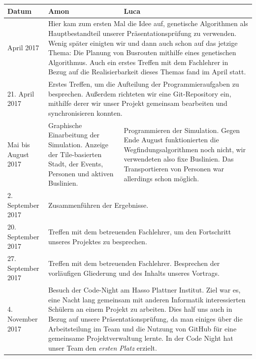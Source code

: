 \documentclass[a4paper, 11pt]{scrartcl}
\begin{document}
\newlength\tabledate
\newlength\tablecontent
\newlength\tablerow
\setlength{\tabledate}{3.5cm}
\setlength{\tablecontent}{10.5cm}
\setlength{\tablerow}{5.1cm}
\begin{longtable}{p{\tabledate}|p{\tablerow}|p{\tablerow}} %

\textbf{Datum} & \textbf{Amon} & \textbf{Luca} \\
\hline

April 2017 & \multicolumn{2}{p{\tablecontent}}{Hier kam zum ersten Mal die Idee auf, genetische Algorithmen als Hauptbestandteil unserer Präsentationsprüfung zu verwenden. Wenig später einigten wir und dann auch schon auf das jetzige Thema: Die Planung von Busrouten mithilfe eines genetischen Algorithmus. Auch ein erstes Treffen mit dem Fachlehrer in Bezug auf die Realisierbarkeit dieses Themas fand im April statt.}\\
\hline

21. April 2017 & \multicolumn{2}{p{\tablecontent}}{Erstes Treffen, um die Aufteilung der Programmieraufgaben zu besprechen. Außerdem richteten wir eine Git-Repository ein, mithilfe derer wir unser Projekt gemeinsam bearbeiten und synchronisieren konnten.}\\
\hline

Mai bis August 2017 & Graphische Einarbeitung der Simulation. Anzeige der Tile-basierten Stadt, der Events, Personen und aktiven Buslinien. & Programmieren der Simulation. Gegen Ende August funktionierten die Wegfindungsalgorithmen noch nicht, wir verwendeten also fixe Buslinien. Das Transportieren von Personen war allerdings schon möglich.\\
\hline

2. September 2017 & \multicolumn{2}{p{\tablecontent}}{Zusammenführen der Ergebnisse.}\\
\hline

20. September 2017 & \multicolumn{2}{p{\tablecontent}}{Treffen mit dem betreuenden Fachlehrer, um den Fortschritt unseres Projektes zu besprechen.}\\
\hline

27. September 2017 & \multicolumn{2}{p{\tablecontent}}{Treffen mit dem betreuenden Fachlehrer. Besprechen der vorläufigen Gliederung und des Inhalts unseres Vortrags.}\\
\hline

4. November 2017 & \multicolumn{2}{p{\tablecontent}}{Besuch der Code-Night am Hasso Plattner Institut. Ziel war es, eine Nacht lang gemeinsam mit anderen Informatik interessierten Schülern an einem Projekt zu arbeiten. Dies half uns auch in Bezug auf unsere Präsentationsprüfung, da man einiges über die Arbeitsteilung im Team und die Nutzung von GitHub \cite{trafficsimGitHub} für eine gemeinsame Projektverwaltung lernte. In der Code Night hat unser Team den \textit{ersten Platz} erzielt.}\\
\hline


\end{longtable}
\end{document}
